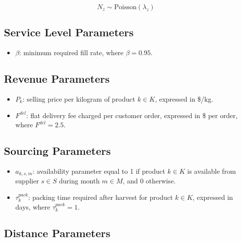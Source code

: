 \documentclass[12pt]{article}
\begin{document}
\[
N_z \sim \text{Poisson}(\lambda_z)
\]

\subsection{Service Level Parameters}
\begin{itemize}
    \item $\beta$: minimum required fill rate, where $\beta = 0.95$.
\end{itemize}

\subsection{Revenue Parameters}
\begin{itemize}
    \item $P_k$: selling price per kilogram of product $k \in K$, expressed in \$/kg.

    \item $F^{del}$: flat delivery fee charged per customer order, expressed in \$ per order, where $F^{del} = 2.5$.
\end{itemize}

\subsection{Sourcing Parameters}

\begin{itemize}
    \item $a_{k,s,m}$: availability parameter equal to 1 if product $k \in K$ is available from supplier $s \in S$ during month $m \in M$, and 0 otherwise.

    \item $\tau^{pack}_k$: packing time required after harvest for product $k \in K$, expressed in days, where $\tau^{pack}_k = 1$.
\end{itemize}

\subsection{Distance Parameters}
\end{document}
